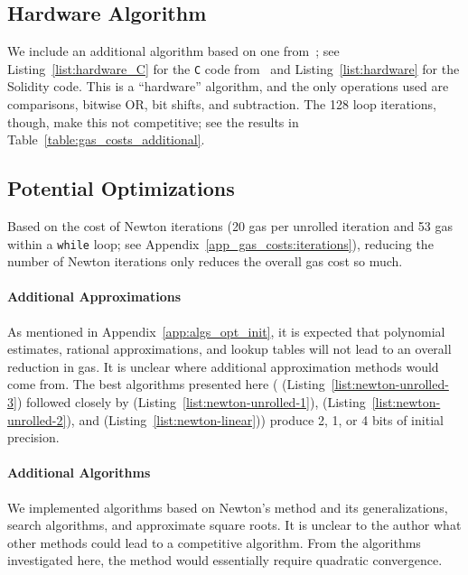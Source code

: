 



\subsection{Hardware Algorithm}

We include an additional algorithm based on one
from~\cite[Page 285]{HackersDelight};
see Listing~\ref{list:hardware_C}
for the \texttt{C} code from~\cite{HackersDelightArchive}
and Listing~\ref{list:hardware} for the Solidity code.
This is a ``hardware'' algorithm,
and the only operations used are comparisons, bitwise OR, bit shifts,
and subtraction.
The 128 loop iterations, though, make this not competitive;
see the results in Table~\ref{table:gas_costs_additional}.





\subsection{Potential Optimizations}

Based on the cost of Newton iterations (20 gas per unrolled iteration
and 53 gas within a \texttt{while} loop;
see Appendix~\ref{app_gas_costs:iterations}),
reducing the number of Newton iterations only reduces the overall
gas cost so much.

\paragraph{Additional Approximations}
As mentioned in Appendix~\ref{app:algs_opt_init},
it is expected that polynomial estimates, rational approximations,
and lookup tables will not lead to an overall reduction in gas.
It is unclear where additional approximation methods would come from.
The best algorithms presented here
(\UnrolledThree{} (Listing~\ref{list:newton-unrolled-3})
followed closely by
\UnrolledOne{} (Listing~\ref{list:newton-unrolled-1}),
\UnrolledTwo{} (Listing~\ref{list:newton-unrolled-2}), and
\Linear{} (Listing~\ref{list:newton-linear}))
produce 2, 1, or 4 bits of initial precision.

\paragraph{Additional Algorithms}
We implemented algorithms based on Newton's method
and its generalizations, search algorithms,
and approximate square roots.
It is unclear to the author what other methods could lead
to a competitive algorithm.
From the algorithms investigated here,
the method would essentially require quadratic convergence.

